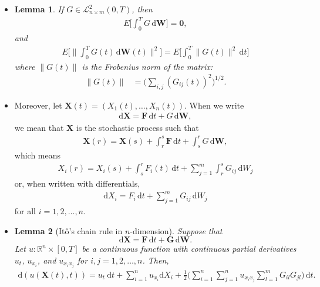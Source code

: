 \documentclass[10pt]{article}
\newtheorem{lemma}{Lemma}
\newcommand{\dee}{\mathrm{d}}
\newcommand{\ve}[1]{\mathbf{#1}}
\newcommand{\mcal}[1]{\mathcal{#1}}
\newcommand{\Real}{\mathbb{R}}
\begin{document}
\begin{itemize}
  \item \begin{lemma}
    If $G \in \mcal{L}_{n\times m}^2(0,T)$, then
    \begin{align*}
      E\bigg[ \int_0^T G\, \dee\ve{W} \bigg] = \ve{0},
    \end{align*}
    and
    \begin{align*}
      E\bigg[ \bigg\| \int_0^T G(t)\, \dee\ve{W}(t) \bigg\|^2 \bigg]
      = E\bigg[ \int_0^T \| G(t) \|^2\, \dee t \bigg]
    \end{align*}
    where $\| G(t) \|$ is the Frobenius norm of the matrix:
    \begin{align*}
      \| G(t) \| &= \bigg( \sum_{i,j} (G_{ij}(t))^2 \bigg)^{1/2}.
    \end{align*}
  \end{lemma}

  \item Moreover, let $\ve{X}(t) = (X_1(t), \dotsc, X_n(t))$. When we write
  \begin{align*}
    \dee \ve{X} = \ve{F}\, \dee t + G\, \dee \ve{W},    
  \end{align*}
  we mean that $\ve{X}$ is the stochastic process such that
  \begin{align*}
    \ve{X}(r) = \ve{X}(s) + \int_r^s \ve{F}\, \dee t + \int_s^r G\, \dee \ve{W},
  \end{align*}
  which means
  \begin{align*}
    X_i(r) = X_i(s) + \int_s^r F_i(t)\, \dee t + \sum_{j=1}^m \int_{r}^s G_{ij}\, \dee W_j
  \end{align*}
  or, when written with differentials,
  \begin{align*}
    \dee X_i = F_i\, \dee t + \sum_{j=1}^m G_{ij}\, \dee W_j
  \end{align*}
  for all $i = 1, 2, \dotsc, n$.

  \item \begin{lemma}[It\^{o}'s chain rule in $n$-dimension]
    Suppose that $$\dee \ve{X} = \ve{F}\, \dee t + \ve{G}\, \dee\ve{W}.$$ Let $u : \Real^n \times [0,T]$ be a continuous function with continuous partial derivatives $u_t$, $u_{x_i}$, and $u_{x_i x_j}$ for $i,j = 1, 2, \dotsc, n$. Then,
    \begin{align*}
      \dee(u(\ve{X}(t), t)) = u_t\ \dee t + \sum_{i=1}^n u_{x_i}\dee X_i + \frac{1}{2} \bigg( \sum_{i=1}^n \sum_{j=1}^n u_{x_i x_j} \sum_{l=1}^m G_{il}G_{jl} \bigg)\, \dee t.
    \end{align*}
  \end{lemma}


\end{itemize}
\end{document}
